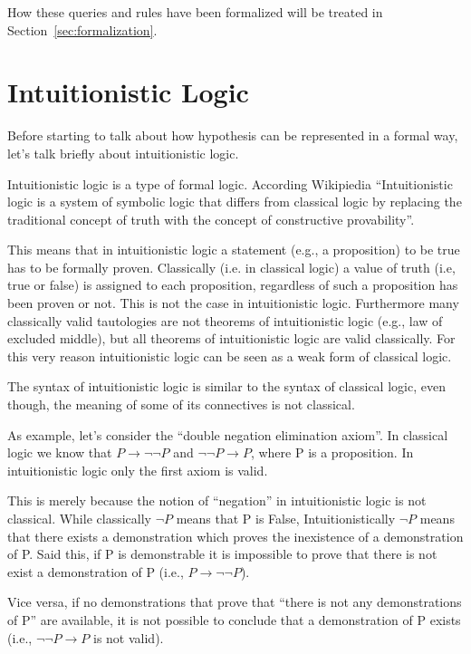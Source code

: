 How these queries and rules have been formalized will be treated in
Section~\ref{sec:formalization}.

\section{Intuitionistic Logic}
\label{sec:il}
Before starting to talk about how hypothesis can be represented in a formal way,
let's talk briefly about intuitionistic logic.

Intuitionistic logic is a type of formal logic.
According Wikipiedia ``Intuitionistic logic is a system of symbolic logic that
differs from classical logic by replacing the traditional concept of truth with
the concept of constructive provability''.

This means that in intuitionistic logic a statement (e.g., a proposition) to be true
has to be formally proven.
Classically (i.e. in classical logic) a value of truth (i.e,
true or false) is assigned to each proposition, regardless of such a proposition
has been proven or not. This is not the case in intuitionistic logic. Furthermore
many classically valid tautologies are not theorems of intuitionistic logic (e.g.,
law of excluded middle), but all theorems of intuitionistic logic are valid classically.
For this very reason intuitionistic logic can be seen as a weak form of classical logic.

The syntax of intuitionistic logic is similar to the syntax of classical logic,
even though, the meaning of some of its connectives is not classical.

As example, let's consider the ``double negation elimination axiom''.
In classical logic we know that $P \to \lnot\lnot P$ and $\lnot\lnot P \to  P$, where P
is a proposition. In intuitionistic logic only the first axiom is valid.

This is merely because the notion of ``negation'' in intuitionistic logic is not classical.
While classically $\lnot P$ means that P is False, Intuitionistically $\lnot P$ means that
there exists a demonstration which proves the inexistence of a demonstration of P.
Said this, if P is demonstrable it is impossible
to prove that there is not exist a demonstration of P (i.e.,  $P \to \lnot\lnot P$).

Vice versa, if no demonstrations that prove that ``there is not any demonstrations of P'' are available,
it is not possible to conclude that a demonstration of P exists (i.e., $\lnot\lnot P \to  P$ is not
valid).

